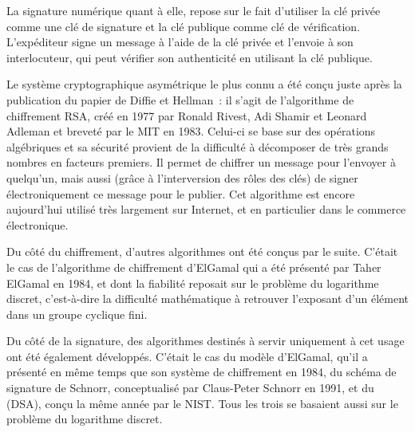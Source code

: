 La signature numérique quant à elle, repose sur le fait d'utiliser la clé privée comme une clé de signature et la clé publique comme clé de vérification. L'expéditeur signe un message à l'aide de la clé privée et l'envoie à son interlocuteur, qui peut vérifier son authenticité en utilisant la clé publique.

Le système cryptographique asymétrique le plus connu a été conçu juste après la publication du papier de Diffie et Hellman~: il s'agit de l'algorithme de chiffrement RSA, créé en 1977 par Ronald Rivest, Adi Shamir et Leonard Adleman et breveté par le MIT en 1983. Celui-ci se base sur des opérations algébriques et sa sécurité provient de la difficulté à décomposer de très grands nombres en facteurs premiers. Il permet de chiffrer un message pour l'envoyer à quelqu'un, mais aussi (grâce à l'interversion des rôles des clés) de signer électroniquement ce message pour le publier. Cet algorithme est encore aujourd'hui utilisé très largement sur Internet, et en particulier dans le commerce électronique.

Du côté du chiffrement, d'autres algorithmes ont été conçus par le suite. C'était le cas de l'algorithme de chiffrement d'ElGamal qui a été présenté par Taher ElGamal en 1984, et dont la fiabilité reposait sur le problème du logarithme discret, c'est-à-dire la difficulté mathématique à retrouver l'exposant d'un élément dans un groupe cyclique fini.

Du côté de la signature, des algorithmes destinés à servir uniquement à cet usage ont été également développés. C'était le cas du modèle d'ElGamal, qu'il a présenté en même temps que son système de chiffrement en 1984, du schéma de signature de Schnorr, conceptualisé par Claus-Peter Schnorr en 1991, et du  (DSA), conçu la même année par le NIST. Tous les trois se basaient aussi sur le problème du logarithme discret.

